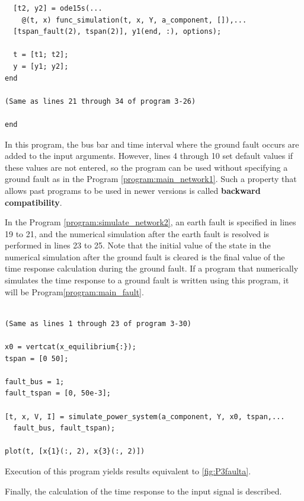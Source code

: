 \documentclass[tombow,dvipdfmx]{corona-a5-1.1}
\begin{document}
\begin{例}
\begin{PROGRAMA}[count,title={simulate\_power\_system.m}]
\begin{verbatim}
  [t2, y2] = ode15s(...
    @(t, x) func_simulation(t, x, Y, a_component, []),...
  [tspan_fault(2), tspan(2)], y1(end, :), options);

  t = [t1; t2];
  y = [y1; y2];
end

(Same as lines 21 through 34 of program 3-26)

end
\end{verbatim}
\end{PROGRAMA}

In this program, the bus bar and time interval where the ground fault occurs are added to the input arguments.
However, lines 4 through 10 set default values if these values are not entered, so the program can be used without specifying a ground fault as in the Program \nobreak\ref{program:main_network1}.
Such a property that allows past programs to be used in newer versions is called \textbf{backward compatibility}.

In the Program \nobreak\ref{program:simulate_network2}, an earth fault is specified in lines 19 to 21, and the numerical simulation after the earth fault is resolved is performed in lines 23 to 25.
Note that the initial value of the state in the numerical simulation after the ground fault is cleared is the final value of the time response calculation during the ground fault.
If a program that numerically simulates the time response to a ground fault is written using this program, it will be Program\nobreak\ref{program:main_fault}.

\smallskip
\begin{PROGRAMA}[count,title={main\_simulation\_3bus\_fault.m}]\label{program:main_fault}
\begin{verbatim}

(Same as lines 1 through 23 of program 3-30)

x0 = vertcat(x_equilibrium{:});
tspan = [0 50];

fault_bus = 1;
fault_tspan = [0, 50e-3];

[t, x, V, I] = simulate_power_system(a_component, Y, x0, tspan,...
  fault_bus, fault_tspan);

plot(t, [x{1}(:, 2), x{3}(:, 2)])
\end{verbatim}
\end{PROGRAMA}

Execution of this program yields results equivalent to \ref{fig:P3faulta}.
\end{例}

Finally, the calculation of the time response to the input signal is described.
\end{document}
